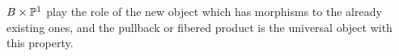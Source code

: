 \documentclass[12pt]{memoir}
\begin{document}
\begin{ptcb}
\begin{center}
\end{center}
$B\times\mathbb{P}^1$ play the role of the new object which has morphisms to the already existing ones, and the pullback or fibered product is the universal object with this property.
\end{ptcb}

\ifx\nextra\undefined
\printindex
\else\fi
\nocite{*}


\end{document}
